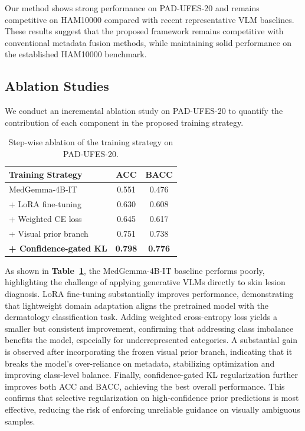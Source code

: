 \documentclass[preprint,12pt]{elsarticle}
\begin{document}
Our method shows strong performance on PAD-UFES-20 and remains competitive on HAM10000 compared with recent representative VLM baselines. These results suggest that the proposed framework remains competitive with conventional metadata fusion methods, while maintaining solid performance on the established HAM10000 benchmark.

\subsection{Ablation Studies}
We conduct an incremental ablation study on PAD-UFES-20 to quantify the contribution of each component in the proposed training strategy.

\begin{table}[!htbp]
	\centering
	\caption{Step-wise ablation of the training strategy on PAD-UFES-20.}
	\label{tab:ablation}
	\setlength{\tabcolsep}{15pt}
	\begin{tabular}{lcc}
		\toprule
		\textbf{Training Strategy} & \textbf{ACC} & \textbf{BACC} \\
		\midrule
		MedGemma-4B-IT      & 0.551  & 0.476  \\
		\quad + LoRA fine-tuning           & 0.630  & 0.608  \\
		\quad + Weighted CE loss           & 0.645  & 0.617  \\
		\quad + Visual prior branch        & 0.751  & 0.738  \\
		\quad \textbf{+ Confidence-gated KL} & \textbf{0.798} & \textbf{0.776} \\
		\bottomrule
	\end{tabular}
\end{table}

As shown in \textbf{Table~\ref{tab:ablation}}, the MedGemma-4B-IT baseline performs poorly, highlighting the challenge of applying generative VLMs directly to skin lesion diagnosis. LoRA fine-tuning substantially improves performance, demonstrating that lightweight domain adaptation aligns the pretrained model with the dermatology classification task. Adding weighted cross-entropy loss yields a smaller but consistent improvement, confirming that addressing class imbalance benefits the model, especially for underrepresented categories. A substantial gain is observed after incorporating the frozen visual prior branch, indicating that it breaks the model's over-reliance on metadata, stabilizing optimization and improving class-level balance. Finally, confidence-gated KL regularization further improves both ACC and BACC, achieving the best overall performance. This confirms that selective regularization on high-confidence prior predictions is most effective, reducing the risk of enforcing unreliable guidance on visually ambiguous samples.
\end{document}
